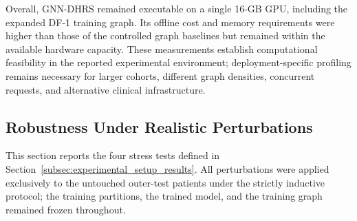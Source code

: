 \documentclass[pdflatex,sn-mathphys-num]{sn-jnl}%
\theoremstyle{thmstyleone}%
\theoremstyle{thmstyletwo}%
\theoremstyle{thmstylethree}%
\begin{document}
{ {
Overall, GNN-DHRS remained executable on a single 16-GB GPU, including the
expanded DF-1 training graph. Its offline cost and memory requirements were
higher than those of the controlled graph baselines but remained within the
available hardware capacity. These measurements establish computational
feasibility in the reported experimental environment; deployment-specific
profiling remains necessary for larger cohorts, different graph densities,
concurrent requests, and alternative clinical infrastructure.
}%
\subsection{Robustness Under Realistic Perturbations}
\label{subsec:robustness_perturbations}

 {
This section reports the four stress tests defined in
Section~\ref{subsec:experimental_setup_results}. All perturbations were
applied exclusively to the untouched outer-test patients under the strictly
inductive protocol; the training partitions, the trained model, and the
training graph remained frozen throughout.
}

\begingroup
 
}
\end{document}
